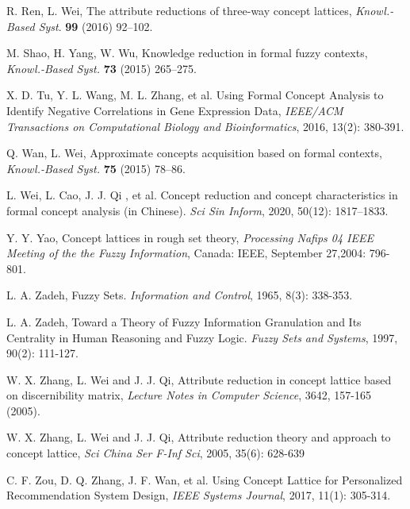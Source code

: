 \documentclass[11pt]{article}
\numberwithin{equation}{subsection}
\begin{document}
\begin{thebibliography}{aa}
R. Ren, L. Wei, The attribute reductions of three-way concept lattices, \textit{Knowl.-Based Syst}. \textbf{99} (2016) 92--102.



M. Shao, H. Yang, W. Wu, Knowledge reduction in formal fuzzy contexts, \textit{Knowl.-Based Syst.} \textbf{73} (2015) 265--275.

X. D. Tu, Y. L. Wang, M. L. Zhang, et al. Using Formal Concept Analysis to Identify Negative Correlations in Gene Expression Data,
\textit{IEEE/ACM Transactions on Computational Biology and Bioinformatics},
2016, 13(2): 380-391.


Q. Wan, L. Wei, Approximate concepts acquisition based on formal contexts, \textit{Knowl.-Based Syst.} \textbf{75} (2015) 78--86.

L. Wei, L. Cao, J. J. Qi , et al. Concept reduction and concept characteristics in formal concept analysis (in Chinese).
\textit{Sci Sin Inform}, 2020, 50(12): 1817--1833.


Y. Y. Yao,  Concept lattices in rough set theory,  \textit{Processing Nafips 04 IEEE Meeting of the the Fuzzy Information},
Canada: IEEE,  September 27,2004: 796-801.

L. A. Zadeh,  Fuzzy Sets. \textit{Information and Control}, 1965, 8(3):
338-353.


L. A. Zadeh, Toward a Theory of Fuzzy Information Granulation and
Its Centrality in Human Reasoning and Fuzzy Logic. \textit{Fuzzy Sets and
Systems}, 1997, 90(2): 111-127.


W. X. Zhang, L. Wei and J. J. Qi, Attribute reduction
in concept lattice based on discernibility matrix, \textit{
Lecture Notes in Computer Science}, 3642, 157-165
(2005).

W. X. Zhang, L. Wei and J. J. Qi,
Attribute reduction theory and approach to concept lattice, \textit{Sci China Ser F-Inf Sci}, 2005,
35(6): 628-639

C. F. Zou, D. Q. Zhang, J. F. Wan, et al. Using Concept Lattice
for Personalized Recommendation System Design, \textit{IEEE Systems
Journal}, 2017, 11(1): 305-314.

\end{thebibliography}
\end{document}
